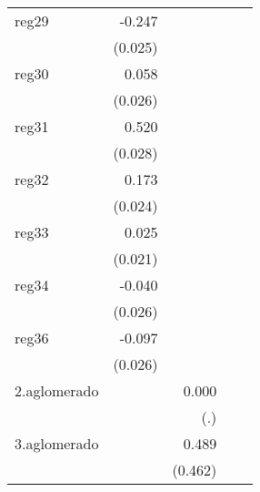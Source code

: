 {\begin{longtable}{l*{4}{D{.}{.}{-1}}}
\addlinespace
reg29       &      -0.247\sym{***}&                     &                     &                     \\
            &     (0.025)         &                     &                     &                     \\
\addlinespace
reg30       &       0.058\sym{*}  &                     &                     &                     \\
            &     (0.026)         &                     &                     &                     \\
\addlinespace
reg31       &       0.520\sym{***}&                     &                     &                     \\
            &     (0.028)         &                     &                     &                     \\
\addlinespace
reg32       &       0.173\sym{***}&                     &                     &                     \\
            &     (0.024)         &                     &                     &                     \\
\addlinespace
reg33       &       0.025         &                     &                     &                     \\
            &     (0.021)         &                     &                     &                     \\
\addlinespace
reg34       &      -0.040         &                     &                     &                     \\
            &     (0.026)         &                     &                     &                     \\
\addlinespace
reg36       &      -0.097\sym{***}&                     &                     &                     \\
            &     (0.026)         &                     &                     &                     \\
\addlinespace
2.aglomerado&                     &       0.000         &                     &                     \\
            &                     &         (.)         &                     &                     \\
\addlinespace
3.aglomerado&                     &       0.489         &                     &                     \\
            &                     &     (0.462)         &                     &                     \\

\end{longtable}}

